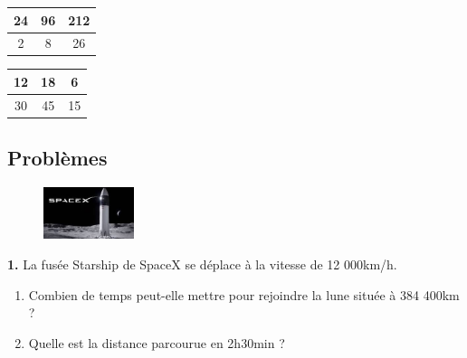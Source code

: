 \begin{multicols}{2}
  \begin{center}
    \begin{tabular}{|c|c|c|}
      \hline
      24 & 96 & 212 \\  \hline
      2 & 8 & 26\\  \hline
    \end{tabular}
  \end{center}
  \begin{center}
    \begin{tabular}{|c|c|c|}
      \hline
      12 & 18 & 6 \\  \hline
      30 & 45 & 15\\  \hline
    \end{tabular}
  \end{center}
\end{multicols}

\Pointilles[6]


\subsection*{Problèmes}

\begin{minipage}[t]{0.25\textwidth}
  \begin{figure}[H]
    \centering
    \includegraphics[width=100px]{4x2-proportionnalite/ex1.jpg}
  \end{figure}
\end{minipage}
\begin{minipage}[t]{0.75\textwidth}
\textbf{1.} La fusée Starship de SpaceX se déplace à la vitesse de 12 000km/h. 

\begin{enumerate}
  \item[1.] Combien de temps peut-elle mettre pour rejoindre la lune située à 384 400km ? 
  \item[2.] Quelle est la distance parcourue en 2h30min ? 
\end{enumerate}

\Pointilles[2]
\end{minipage}

\Pointilles[6]

\newpage

